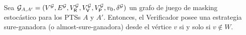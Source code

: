 \begin{theorem}\label{th:strat-W} 
  Sea
  $\mathcal{G}_{A,A'} = (V^{\mathcal{G}}, E^{\mathcal{G}}, V^{\mathcal{G}}_{\mathsf{R}}, V^{\mathcal{G}}_{\mathsf{V}}, V^{\mathcal{G}}_{\mathsf{P}}, v_0, \delta^{\mathcal{G}})$
  un grafo de juego de masking estocástico para los PTSs $A$ y $A'$.  Entonces, el
  Verificador posee una estrategia sure-ganadora (o almost-sure-ganadora) desde el vértice $v$ si y solo si
  $v \notin W$.
\end{theorem}

\noindent
